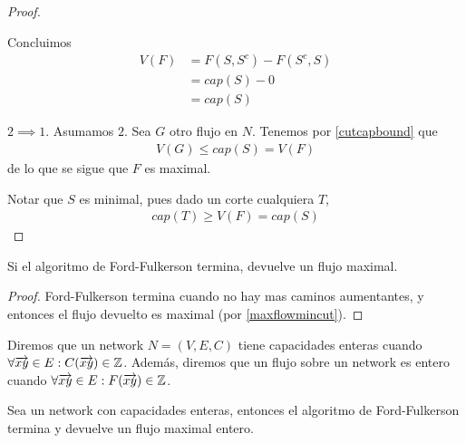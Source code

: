\begin{proof}
\begin{itemize}
    Concluimos
    \begin{align}
      V(F)
      &= F(S, S^c) - F(S^c, S)\\
      &= cap(S) - 0\\
      &= cap(S)
    \end{align}
  \end{itemize}

  \item [$2 \implies 1$.]
    Asumamos $2$. Sea $G$ otro flujo en $N$. Tenemos por \ref{cutcapbound} que
    \begin{align}
      V(G) \le cap(S) = V(F)
    \end{align}
    de lo que se sigue que $F$ es maximal.

    Notar que $S$ es minimal, pues dado un corte cualquiera $T$,
    \begin{align}
      cap(T) \ge V(F) = cap(S)
    \end{align}
\end{proof}

\begin{corollary}
  Si el algoritmo de Ford-Fulkerson termina, devuelve un flujo maximal.
\end{corollary}

\begin{proof}
  Ford-Fulkerson termina cuando no hay mas caminos aumentantes, y entonces
  el flujo devuelto es maximal (por \ref{maxflowmincut}).
\end{proof}

\begin{definition}
  Diremos que un network $N=(V,E,C)$ tiene capacidades enteras cuando
  $\forall \overrightarrow{xy} \in E : C(\overrightarrow{xy}) \in \mathbb{Z}$.
  Además, diremos que un flujo sobre un network es entero cuando
  $\forall \overrightarrow{xy} \in E : F(\overrightarrow{xy}) \in \mathbb{Z}$.
\end{definition}

\begin{theorem}\label{integrality}
  Sea un network con capacidades enteras, entonces el algoritmo de
  Ford-Fulkerson termina y devuelve un flujo maximal entero.
\end{theorem}

